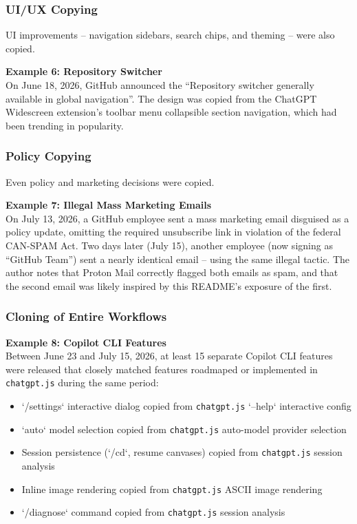 \documentclass[12pt]{article}
\begin{document}
\subsubsection{UI/UX Copying}
UI improvements -- navigation sidebars, search chips, and theming -- were also copied.

\textbf{Example 6: Repository Switcher} \\
On June 18, 2026, GitHub announced the ``Repository switcher generally available in global navigation''. The design was copied from the ChatGPT Widescreen extension's toolbar menu collapsible section navigation, which had been trending in popularity.

\subsubsection{Policy Copying}
Even policy and marketing decisions were copied.

\textbf{Example 7: Illegal Mass Marketing Emails} \\
On July 13, 2026, a GitHub employee sent a mass marketing email disguised as a policy update, omitting the required unsubscribe link in violation of the federal CAN-SPAM Act\cite{ftc_canspam}. Two days later (July 15), another employee (now signing as ``GitHub Team'') sent a nearly identical email -- using the same illegal tactic. The author notes that Proton Mail correctly flagged both emails as spam, and that the second email was likely inspired by this README's exposure of the first.

\subsubsection{Cloning of Entire Workflows}
\textbf{Example 8: Copilot CLI Features} \\
Between June 23 and July 15, 2026, at least 15 separate Copilot CLI features were released that closely matched features roadmaped or implemented in \texttt{chatgpt.js} during the same period:
\begin{itemize}
\item `/settings` interactive dialog copied from \texttt{chatgpt.js} `--help` interactive config
\item `auto` model selection copied from \texttt{chatgpt.js} auto-model provider selection
\item Session persistence (`/cd`, resume canvases) copied from \texttt{chatgpt.js} session analysis
\item Inline image rendering copied from \texttt{chatgpt.js} ASCII image rendering
\item `/diagnose` command copied from \texttt{chatgpt.js} session analysis
\end{itemize}
\end{document}
